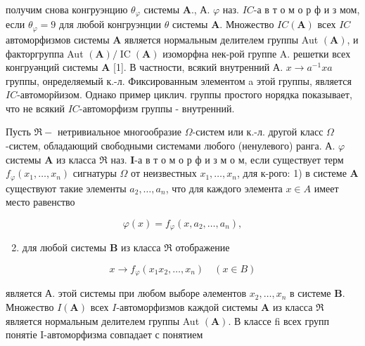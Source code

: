 \documentclass[10pt]{article}
\begin{document}
получим снова конгруэнцию $\theta_{\varphi}$ системы $\boldsymbol{A}$., А. $\varphi$ наз. $I C$-а в т о м о р ф и з мом, если $\theta_{\varphi}=9$ для любой конгруэнции $\theta$ системы $\boldsymbol{A}$. Множество $I C(\boldsymbol{A})$ всех $I C$ автоморфизмов системы $\boldsymbol{A}$ является нормальным делителем группы Aut $(\boldsymbol{A})$, и факторгруппа Aut $(\boldsymbol{A}) / \operatorname{IC}(\boldsymbol{A})$ изоморфна нек-рой группе $\mathrm{A}$. решетки всех конгруәнций системы $\boldsymbol{A}$ [1]. В частности, всякий внутренний А. $x \rightarrow a^{-1} x a$ группы, онределяемый к.-л. Фиксированным элементом a этой группы, является $I C$-автоморйизом. Однако пример циклич. группы простого норядка показывает, что не всякий $I C$-автоморфизм группы - внутренний.



Пусть $\Re-$ нетривиальное многообразие $\Omega$-систем или к.-л. другой класс $\Omega$-систем, обладающий свободными системами любого (ненулевого) ранга. А. $\varphi$ системы $\boldsymbol{A}$ из класса $\Re$ наз. $\boldsymbol{I}$-а в т о м о р ф и з м о м, если существует терм $f_{\varphi}\left(x_{1}, \ldots, x_{n}\right)$ сигнатуры $\Omega$ от неизвестных $x_{1}, \ldots, x_{n}$, для к-рого: 1) в системе $\boldsymbol{A}$ существуют такие элементы $a_{2}, \ldots, a_{n}$, что для каждого элемента $x \in A$ имеет место равенство



\[

\varphi(x)=f_{\varphi}\left(x, a_{2}, \ldots, a_{n}\right),

\]



\begin{enumerate}

  \setcounter{enumi}{1}

  \item для любой системы $\boldsymbol{B}$ из класса $\Re$ отображение

\end{enumerate}



\[

x \longrightarrow f_{\varphi}\left(x_{1} x_{2}, \ldots, x_{n}\right) \quad(x \in B)

\]



является А. этой системы при любом выборе әлементов $x_{2}, \ldots, x_{n}$ в системе $\boldsymbol{B}$. Множество $I(\boldsymbol{A})$ всех $I$-автоморфизмов каждой системы $\boldsymbol{A}$ из класса $\mathfrak{\Re}$ является нормальным делителем группы Aut $(\boldsymbol{A})$. В классе fi всех групп понятіе I-автоморфизма совпадает с понятием
\end{document}
